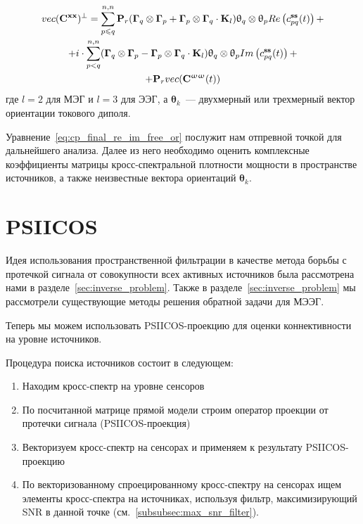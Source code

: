 \begin{multline}
    vec(\mathbf{C}^{\mathbf{x x}})^\perp = \sum\limits_{p\leqslant q}^{n,n}
    \mathbf{P}_r(\mathbf{\Gamma}_q\otimes \mathbf{\Gamma}_p +
                 \mathbf{\Gamma}_p\otimes \mathbf{\Gamma}_q\cdot \mathbf{K}_l)
                 \mathbf{\uptheta}_q \otimes \mathbf{\uptheta}_p
           Re\left(c_{pq}^{\mathbf{ss}}(t)\right) + \\
       +    i \cdot \sum\limits_{p<q}^{n,n}
           (\mathbf{\Gamma}_q\otimes \mathbf{\Gamma}_p -
            \mathbf{\Gamma}_p\otimes \mathbf{\Gamma}_q\cdot \mathbf{K}_l)
            \mathbf{\uptheta}_q \otimes \mathbf{\uptheta}_p
           Im\left(c_{pq}^{\mathbf{ss}}(t)\right) + \\
       +   \mathbf{P}_r vec(\mathbf{C}^{\mathbf{\upomega \upomega}}(t))
    \label{eq:cp_final_re_im_free_or}
\end{multline}
где $l=2$ для МЭГ и $l=3$ для ЭЭГ, а $\mathbf{\theta}_k$~--- двухмерный или трехмерный вектор ориентации токового диполя.

Уравнение~\ref{eq:cp_final_re_im_free_or} послужит нам отпревной точкой для дальнейшего анализа.
Далее из него необходимо оценить комплексные коэффициенты матрицы кросс-спектральной плотности мощности в
пространстве источников, а также неизвестные вектора ориентаций $\mathbf{\theta}_k$.

\section{PSIICOS}\label{sec:psiicos}
Идея использования пространственной фильтрации в качестве метода борьбы с
протечкой сигнала от совокупности всех активных источников была рассмотрена
нами в разделе~\ref{sec:inverse_problem}.
Также в разделе~\ref{sec:inverse_problem} мы рассмотрели существующие методы решения
обратной задачи для МЭЭГ.

Теперь мы можем использовать PSIICOS-проекцию для оценки
коннективности на уровне источников.

Процедура поиска источников состоит в следующем:
\begin{enumerate}
    \item Находим кросс-спектр на уровне сенсоров
    \item По посчитанной матрице прямой модели строим оператор проекции от протечки сигнала (PSIICOS-проекция)
    \item Векторизуем кросс-спектр на сенсорах и применяем к результату PSIICOS-проекцию
    \item По векторизованному спроецированному кросс-спектру на сенсорах ищем элементы кросс-спектра на
        источниках, используя фильтр, максимизирующий SNR в данной точке (см.~\ref{subsubsec:max_snr_filter}).
\end{enumerate}


